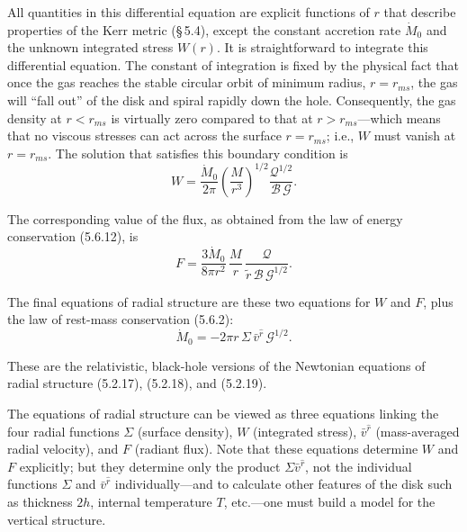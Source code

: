 All quantities in this differential equation are explicit functions of $r$ that
describe properties of the Kerr metric (\S\,5.4), except the constant accretion
rate $\dot{M}_0$ and the unknown integrated stress $W(r)$.  It is straightforward to integrate
this differential equation.  The constant of integration is fixed by the physical
fact that once the gas reaches the stable circular orbit of minimum radius,
$r = r_{ms}$, the gas will ``fall out'' of the disk and spiral rapidly down the hole.
Consequently, the gas density at $r < r_{ms}$ is virtually zero compared to that at
$r > r_{ms}$---which means that no viscous stresses can act across the surface $r = r_{ms}$;
i.e., $W$ must vanish at $r = r_{ms}$.  The solution that satisfies this boundary
condition is
%
\begin{equation}
\tag{5.6.14a}
W = \frac{\dot{M}_0}{2\pi}\left(\frac{M}{r^3}\right)^{\!1/2}
  \frac{\mathscr{Q}^{1/2}}{\mathscr{B}\,\mathscr{G}}.
\end{equation}

The corresponding value of the flux, as obtained from the law of energy conserva\-tion
(5.6.12), is
%
\begin{equation}
\tag{5.6.14b}
F = \frac{3\dot{M}_0}{8\pi r^2}\,\frac{M}{r}\,
  \frac{\mathscr{Q}}{\tilde{r}\,\mathscr{B}\,\mathscr{G}^{1/2}}.
\end{equation}

The final equations of radial structure are these two equations for $W$ and $F$,
plus the law of rest-mass conservation (5.6.2):
%
\begin{equation}
\tag{5.6.14c}
\dot{M}_0 = -2\pi r\,\Sigma\,\bar{v}^{\hat{r}}\,\mathscr{G}^{1/2}.
\end{equation}

These are the relativistic, black-hole versions of the Newtonian equations of
radial structure (5.2.17), (5.2.18), and (5.2.19).

The equations of radial structure can be viewed as three equations linking
the four radial functions $\Sigma$ (surface density), $W$ (integrated stress), $\bar{v}^{\hat{r}}$ (mass-averaged radial velocity), and $F$ (radiant flux).  Note that these equations
determine $W$ and $F$ explicitly; but they determine only the product $\Sigma\bar{v}^{\hat{r}}$, not
the individual functions $\Sigma$ and $\bar{v}^{\hat{r}}$ individually---and to
calculate other features of the disk such as thickness $2h$, internal temperature
$T$, etc.---one must build a model for the vertical structure.



